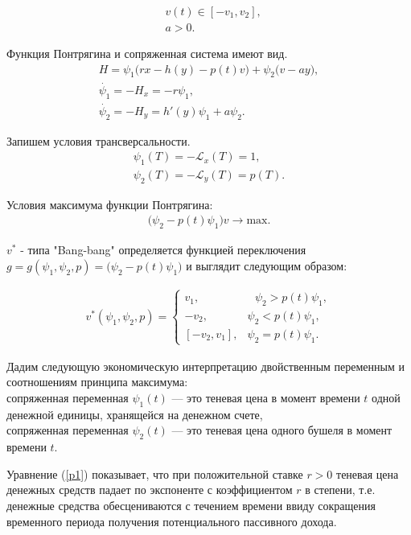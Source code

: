 {\begin{align*}
    & v(t) \in [-v_{1}, v_{2}], \\
    & a > 0.
\end{align*}

Функция Понтрягина и сопряженная система имеют вид. 
\begin{gather}
    {H}  = \psi_{1} \big( r x- h(y) - p(t) v \big) + \psi_{2} \big( v - a y \big),\\
    \Dot{\psi_{1}} = -H_x = -r \psi_{1},\label{p1}\\ 
    \Dot{\psi_{2}}  = -H_y = h'(y) \psi_{1} +  a \psi_{2}.\label{p2}
\end{gather}

Запишем  условия трансверсальности.
\begin{align}
    {\psi_{1}(T)} = \mathcal{- L}_x(T)= 1,\\
    {\psi_{2}(T)} = \mathcal {- L}_y(T)= p(T).
\end{align} 


Условия максимума функции Понтрягина:
\begin{align}
     \big (\psi_{2} - p(t)\psi_{1} \big )v \to \mathrm{max}. \label{p4}
\end{align}


${v^*}$ - типа "Bang-bang" определяется функцией переключения\\
$g = g(\psi_1 , \psi_2, p)= \big (\psi_{2} - p(t)\psi_{1} \big)$ и выглядит следующим образом:

\begin{gather}
v^*(\psi_1 , \psi_2, p) = 
 \begin{cases}
   v_{1}, &\text{ $\psi_{2} > p(t)\psi_{1}$},\\
   -v_{2}, &\text{$\psi_{2} < p(t)\psi_{1}$},\\
   [-v_{2},v_{1}], &\text{$\psi_{2} = p(t)\psi_{1}$}.
 \end{cases}\label{p3}
\end{gather}


Дадим следующую экономическую интерпретацию двойственным переменным и соотношениям принципа максимума:\\
 сопряженная переменная $ \psi_1(t) $ --- это теневая цена в момент времени ${t}$ одной денежной единицы, хранящейся на денежном счете,\\
 сопряженная переменная $ \psi_2(t) $ --- это теневая цена одного бушеля в момент времени ${t}$.
 
 
Уравнение (\ref{p1}) показывает, что при положительной ставке $ r>0 $ теневая цена денежных средств падает по экспоненте с коэффициентом $r$ в степени, т.е.  денежные средства обесцениваются с течением времени ввиду сокращения временного периода получения потенциального пассивного дохода.


}
